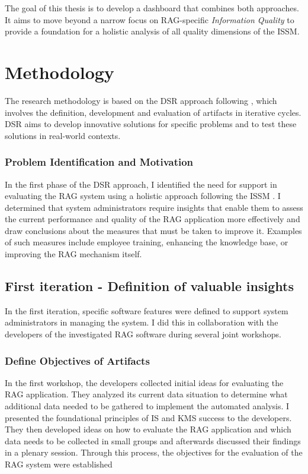 \documentclass[
	english,
	ruledheaders=section,%
	class=report,%
	thesis={type=bachelor},%
	accentcolor=1b,%
	custommargins=true,%
	marginpar=false,%
	parskip=half-,%
	fontsize=11pt,%
	DIV=14,
]{tudapub}
\begin{document}
The goal of this thesis is to develop a dashboard that combines both approaches. It aims to move beyond a narrow focus on RAG-specific \textit{Information Quality} to provide a foundation for a holistic analysis of all quality dimensions of the ISSM.
\chapter{Methodology}
The research methodology is based on the DSR approach following \cite{Peffers2007}, which involves the definition, development and evaluation of artifacts in iterative cycles. DSR aims to develop innovative solutions for specific problems and to test these solutions in real-world contexts.\\
\subsection{Problem Identification and Motivation}
In the first phase of the DSR approach, I identified the need for support in evaluating the RAG system using a holistic approach following the ISSM \parencite{DeloneMcLean2003ISSuccessTenYearUpdate}. I determined that system administrators require insights that enable them to assess the current performance and quality of the RAG application more effectively and draw conclusions about the measures that must be taken to improve it. Examples of such measures include employee training, enhancing the knowledge base, or improving the RAG mechanism itself.
\section{First iteration - Definition of valuable insights}
In the first iteration, specific software features were defined to support system administrators in managing the system. I did this in collaboration with the developers of the investigated RAG software during several joint workshops.
\subsection{Define Objectives of Artifacts}
In the first workshop, the developers collected initial ideas for evaluating the RAG application. They analyzed its current data situation to determine what additional data needed to be gathered to implement the automated analysis. I presented the foundational principles of IS \parencite{DeloneMcLean2003ISSuccessTenYearUpdate} and KMS success \parencite{Jennex2006} to the developers. They then developed ideas on how to evaluate the RAG application and which data needs to be collected in small groups and afterwards discussed their findings in a plenary session. Through this process, the objectives for the evaluation of the RAG system were established
\end{document}
